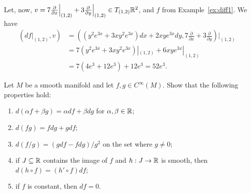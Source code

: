 \begin{example}
  Let, now, $v = 7 \frac{\partial}{\partial x}\Big|_{(1,2)} + 3 \frac{\partial}{\partial y}\Big|_{(1,2)}\in T_{(1,2)}\mathbb{R}^2$, and $f$ from Example~\ref{ex:diff1}.
  We have
  \begin{align}
    (df|_{(1,2)}, v)
    &= \left((y^2 e^{3x} +3xy^2 e^{3x}) dx + 2xy e^{3x} dy, 7 \frac{\partial}{\partial x} + 3 \frac{\partial}{\partial y} \right)\Big|_{(1,2)} \\
    &= 7(y^2 e^{3x} +3xy^2 e^{3x})|_{(1,2)} + 6 xy e^{3x}|_{(1,2)} \\
    &= 7(4 e^3 + 12 e^3) + 12 e^3 = 52e^3.
  \end{align}
\end{example}

\begin{exercise}
  Let $M$ be a smooth manifold and let $f,g\in C^\infty(M)$. Show that the following properties hold:
  \begin{enumerate}
    \item $d(\alpha f + \beta g) = \alpha df + \beta dg$ for $\alpha,\beta\in\mathbb{R}$;
    \item $d(fg) = f dg + g df$;
    \item $d(f/g) = (g df - f dg)/g^2$ on the set where $g\neq 0$;
    \item if $J\subseteq\mathbb{R}$ contains the image of $f$ and $h:J\to\mathbb{R}$ is smooth, then $d(h\circ f) = (h'\circ f) df$;
    \item if $f$ is constant, then $df= 0$.
  \end{enumerate}
\end{exercise}

